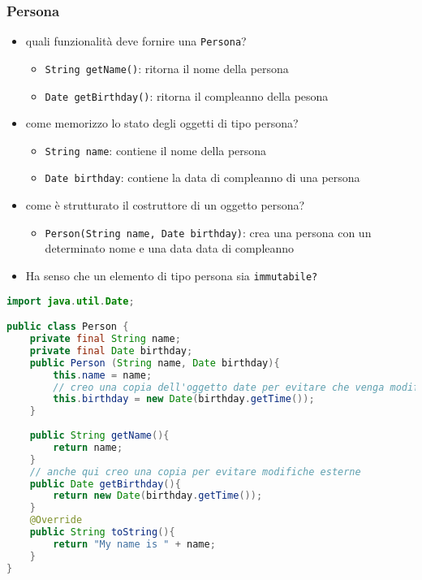 \documentclass{article}
\begin{document}
\subsubsection{Persona}
\begin{itemize}
\item quali funzionalit\`a deve fornire una \texttt{Persona}?
\begin{itemize}
\item \texttt{String getName()}: ritorna il nome della persona
\item \texttt{Date getBirthday()}: ritorna il compleanno della pesona
\end{itemize}
\item come memorizzo lo stato degli oggetti di tipo persona?
\begin{itemize}
\item \texttt{String name}: contiene il nome della persona
\item \texttt{Date birthday}: contiene la data di compleanno di una persona
\end{itemize}
\item come \`e strutturato il costruttore di un oggetto persona?
\begin{itemize}
\item \texttt{Person(String name, Date birthday)}: crea una persona con un determinato nome e una data data di compleanno
\end{itemize}
\item Ha senso che un elemento di tipo persona sia \texttt{immutabile?}
\end{itemize}

\begin{lstlisting}[language=Java,escapechar=|]
import java.util.Date;

public class Person {
	private final String name;
	private final Date birthday;
	public Person (String name, Date birthday){
		this.name = name;
		// creo una copia dell'oggetto date per evitare che venga modificato dall'esterno
		this.birthday = new Date(birthday.getTime());		
	}
	
	public String getName(){
		return name;
	}
	// anche qui creo una copia per evitare modifiche esterne
	public Date getBirthday(){
		return new Date(birthday.getTime());
	}
	@Override
	public String toString(){
		return "My name is " + name;
	}
}
\end{lstlisting}
\end{document}
